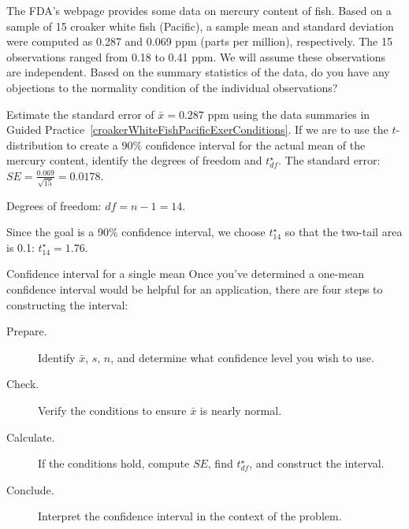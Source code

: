 \begin{exercisewrap}
\begin{nexercise} \label{croakerWhiteFishPacificExerConditions}
The FDA's webpage provides some data on mercury content of fish.
Based on a sample of 15 croaker white fish (Pacific),
a sample mean and standard deviation were computed as 0.287
and 0.069 ppm (parts per million), respectively.
The 15 observations ranged from 0.18 to 0.41 ppm.
We will assume these observations are independent.
Based on the summary statistics of the data,
do you have any objections to the normality condition
of the individual observations?\footnotemark{}
\end{nexercise}
\end{exercisewrap}

\begin{examplewrap}
\begin{nexample}{Estimate the standard error of
    $\bar{x} = 0.287$ ppm using the data summaries in
    Guided Practice~\ref{croakerWhiteFishPacificExerConditions}.
    If we are to use the $t$-distribution to create a
    90\% confidence interval for the actual mean of the
    mercury content, identify the degrees of freedom
    and $t^{\star}_{df}$.}
  \label{croakerWhiteFishPacificExerSEDFTStar}%
  The standard error: $SE = \frac{0.069}{\sqrt{15}} = 0.0178$.

  Degrees of freedom: $df = n - 1 = 14$.

  Since the goal is a 90\% confidence interval,
  we choose $t_{14}^{\star}$ so that the two-tail area
  is 0.1:
  $t^{\star}_{14} = 1.76$.
\end{nexample}
\end{examplewrap}

\begin{onebox}{Confidence interval for a single mean}
  Once you've determined a one-mean confidence interval
  would be helpful for an application,
  there are four steps to constructing the interval:
  \begin{description}
  \item[Prepare.]
      Identify $\bar{x}$, $s$, $n$, and determine what
      confidence level you wish to use.
  \item[Check.]
      Verify the conditions to ensure $\bar{x}$
      is nearly normal.
  \item[Calculate.]
      If the conditions hold, compute $SE$,
      find $t_{df}^{\star}$, and construct the interval.
  \item[Conclude.]
      Interpret the confidence interval in the context
      of the problem.
  \end{description}
\end{onebox}

